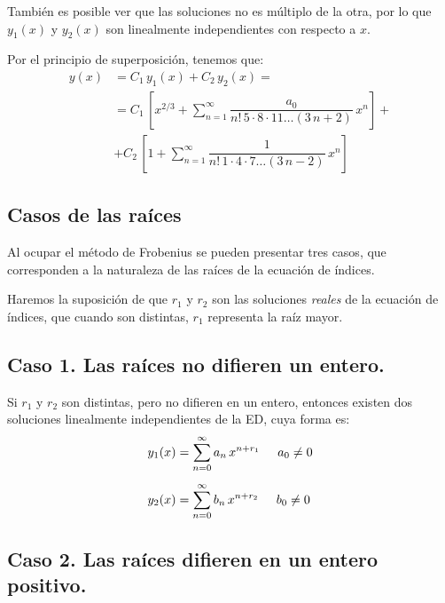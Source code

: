 \par
También es posible ver que las soluciones no es múltiplo de la otra, por lo que $y_{1}(x)$ y $y_{2}(x)$ son linealmente independientes con respecto a $x$.
\par
Por el principio de superposición, tenemos que:
\begin{align*}
y (x) &= C_{1} \, y_{1} (x) + C_{2} \, y_{2} (x) = \\[0.5em]
&= C_{1} \, \left[ x^{2/3} + \sum_{n=1}^{\infty} \dfrac{a_{0}}{n! \, 5 \cdot 8 \cdot 11 \ldots (3\, n + 2)} \, x^{n} \right] + \\[0.5em]
&+ C_{2} \, \left[ 1 + \sum_{n=1}^{\infty} \dfrac{1}{n! \, 1 \cdot 4 \cdot 7 \ldots (3\, n - 2)} \, x^{n} \right]
\end{align*}

\subsection{Casos de las raíces}

Al ocupar el método de Frobenius se pueden presentar tres casos, que corresponden a la naturaleza de las raíces de la ecuación de índices.
\par
Haremos la suposición de que $r_{1}$ y $r_{2}$ son las soluciones \emph{reales} de la ecuación de índices, que cuando son distintas, $r_{1}$ representa la raíz mayor.

\subsection*{Caso 1. Las raíces no difieren un entero.}

Si $r_{1}$ y $r_{2}$ son distintas, pero no difieren  en un entero, entonces existen dos soluciones linealmente independientes de la ED, cuya forma es:
\begin{subequations}
\begin{align}
y_{1}(x) &= \sum_{n=0}^{\infty} a_{n} \, x^{n+r_{1}} \hspace{0.5cm} a_{0} \neq 0 \label{eq:ecuacion_14a} \\[0.5em]
y_{2}(x) &= \sum_{n=0}^{\infty} b_{n} \, x^{n+r_{2}} \hspace{0.5cm} b_{0} \neq 0 \label{eq:ecuacion_14b}
\end{align}
\end{subequations}

\subsection*{Caso 2. Las raíces difieren en un entero positivo.}

